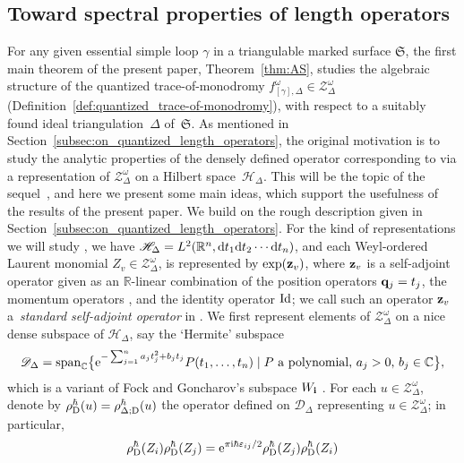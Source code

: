 \documentclass[10pt,a4paper]{amsart}
\numberwithin{equation}{section}
\theoremstyle{definition}
\begin{document}
\subsection{Toward spectral properties of length operators}
\label{subsec:toward_spectral_properties}
For any given essential simple loop $\gamma$ in a triangulable marked surface $\mathfrak{S}$, the first main theorem of the present paper, Theorem~\ref{thm:AS}, studies the algebraic structure of the quantized trace-of-monodromy $f^\omega_{[\gamma],\Delta} \in \mathcal{Z}^\omega_\Delta$ (Definition~\ref{def:quantized_trace-of-monodromy}), with respect to a suitably found ideal triangulation~$\Delta$ of~$\mathfrak{S}$. As mentioned in Section~\ref{subsec:on_quantized_length_operators}, the original motivation is to study the analytic properties of the densely defined operator corresponding to  via a representation of $\mathcal{Z}^\omega_\Delta$ on a Hilbert space~$\mathscr{H}_\Delta$. This will be the topic of the sequel~\cite{sequel}, and here we present some main ideas, which support the usefulness of the results of the present paper. We build on the rough description given in Section~\ref{subsec:on_quantized_length_operators}.
For the kind of representations we will study \cite{FG09, Kim_irreducible}, we have $\mathscr{H}_\Delta = L^2(\mathbb{R}^n, {\rm d}t_1 {\rm d}t_2\cdots {\rm d}t_n)$, and each Weyl-ordered Laurent monomial $Z_v \in \mathcal{Z}^\omega_\Delta$, is represented by $\exp({\bf z}_v)$, where ${\bf z}_v$ is a self-adjoint operator given as an $\mathbb{R}$-linear combination of the position operators ${\bf q}_j =t_j$, the momentum operators , and the identity operator ${\rm Id}$; we call such an operator ${\bf z}_v$ a~{\em standard self-adjoint operator} in \cite{sequel}. We first represent elements of $\mathcal{Z}^\omega_\Delta$ on a nice dense subspace of $\mathscr{H}_\Delta$, say the `Hermite' subspace
\begin{align}
\label{eq:our_Hermite_subspace}
\mathscr{D}_\Delta = {\rm span}_\mathbb{C}\bigl\{ {\rm e}^{- \sum_{j=1}^n a_j t_j^2 + b_j t_j} P(t_1,\dots,t_n) \mid \mbox{$P$ a polynomial, $a_j>0$, $b_j \in \mathbb{C}$}\bigr\},
\end{align}
which is a variant of Fock and Goncharov's subspace $W_{\bf i}$ \cite{FG09}. For each $u\in \mathcal{Z}^\omega_\Delta$, denote by $\rho^\hbar_{\rm D}(u) = \rho^\hbar_{\Delta;{\rm D}}(u)$ the operator defined on $\mathscr{D}_\Delta$ representing $u \in \mathcal{Z}^\omega_\Delta$; in particular, \[\rho^\hbar_{\rm D}(Z_i) \rho^\hbar_{\rm D}(Z_j) = {\rm e}^{\pi {\rm i} \hbar \varepsilon_{ij}/2} \rho^\hbar_{\rm D}(Z_j) \rho^\hbar_{\rm D}(Z_i)\]
\end{document}
